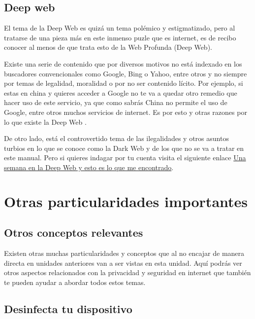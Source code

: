 \documentclass[
  spanish,
  a4paper,
  openany]{book}
\begin{document}
\hypertarget{deep-web}{%
\section{Deep web}\label{deep-web}}

El tema de la Deep Web es quizá un tema polémico y estigmatizado, pero al tratarse de una pieza más en este inmenso puzle que es internet, es de recibo conocer al menos de que trata esto de la Web Profunda (Deep Web).

Existe una serie de contenido que por diversos motivos no está indexado en los buscadores convencionales como Google, Bing o Yahoo, entre otros y no siempre por temas de legalidad, moralidad o por no ser contenido lícito. Por ejemplo, si estas en china y quieres acceder a Google no te va a quedar otro remedio que hacer uso de este servicio, ya que como sabrás China no permite el uso de Google, entre otros muchos servicios de internet. Es por esto y otras razones por lo que existe la Deep Web \citep{OSI-deep-web}.

De otro lado, está el controvertido tema de las ilegalidades y otros asuntos turbios en lo que se conoce como la Dark Web y de los que no se va a tratar en este manual. Pero si quieres indagar por tu cuenta visita el siguiente enlace \href{https://www.xataka.com/analisis/una-semana-en-la-deep-web-esto-es-lo-que-me-he-encontrado}{Una semana en la Deep Web y esto es lo que me encontrado}.

\hypertarget{otras-particularidades-importantes}{%
\chapter{Otras particularidades importantes}\label{otras-particularidades-importantes}}

\hypertarget{otros-conceptos-relevantes}{%
\section{Otros conceptos relevantes}\label{otros-conceptos-relevantes}}

Existen otras muchas particularidades y conceptos que al no encajar de manera directa en unidades anteriores van a ser vistas en esta unidad. Aquí podrás ver otros aspectos relacionados con la privacidad y seguridad en internet que también te pueden ayudar a abordar todos estos temas.

\hypertarget{desinfecta-tu-dispositivo}{%
\section{Desinfecta tu dispositivo}\label{desinfecta-tu-dispositivo}}
\end{document}
